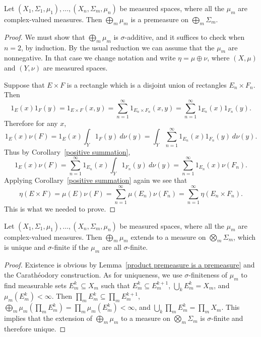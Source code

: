 \begin{lemma}
\label{product premeasure is a premeasure}
Let $(X_1, \Sigma_1, \mu_1), \dots, (X_{n}, \Sigma_{m}, \mu_{n})$ be measured spaces, where all the $\mu_{m}$ are complex-valued measures.
Then $\bigoplus_{m} \mu_{m}$ is a premeasure on $\bigoplus_{m} \Sigma_{m}$.
\end{lemma}
\begin{proof}
We must show that $\bigoplus_{m} \mu_{m}$ is $\sigma$-additive, and it suffices to check when $n = 2$, by induction.
By the usual reduction we can assume that the $\mu_{m}$ are nonnegative.
In that case we change notation and write $\eta = \mu \oplus \nu$, where $(X, \mu)$ and $(Y, \nu)$ are measured spaces.

Suppose that $E \times F$ is a rectangle which is a disjoint union of rectangles $E_{n} \times F_{n}$.
Then
\[1_E(x) 1_F(y) = 1_{E \times F}(x, y) = \sum_{n=1}^{\infty} 1_{E_{n} \times F_{n}}(x, y) = \sum_{n=1}^{\infty} 1_{E_{n}}(x) 1_{F_{n}}(y).\]
Therefore for any $x$,
\[1_E(x) \nu(F) = 1_E(x) \int_{Y} 1_F(y)~d\nu(y) = \int_{Y} \sum_{n=1}^{\infty} 1_{E_{n}}(x) 1_{F_{n}}(y) ~d\nu(y).\]
Thus by Corollary~\ref{positive summation},
\[1_E(x) \nu(F) = \sum_{n=1}^{\infty} 1_{E_{n}}(x) \int_{Y} 1_{F_{n}}(y)~d\nu(y) = \sum_{n=1}^{\infty} 1_{E_{n}}(x)\nu(F_{n}).\]
Applying Corollary~\ref{positive summation} again we see that
\[\eta(E \times F) = \mu(E) \nu(F) = \sum_{n=1}^{\infty} \mu(E_{n}) \nu(F_{n}) = \sum_{n=1}^{\infty} \eta(E_{n} \times F_{n}).\]
This is what we needed to prove.
\end{proof}

\begin{corollary}
Let $(X_1, \Sigma_1, \mu_1), \dots, (X_{n}, \Sigma_{m}, \mu_{n})$ be measured spaces, where all the $\mu_{m}$ are complex-valued measures.
Then $\bigoplus_{m} \mu_{m}$ extends to a measure on $\bigotimes_{m} \Sigma_{m}$, which is unique and $\sigma$-finite if the $\mu_{m}$ are all $\sigma$-finite.
\end{corollary}
\begin{proof}
Existence is obvious by Lemma~\ref{product premeasure is a premeasure} and the Carathéodory construction.
As for uniqueness, we use $\sigma$-finiteness of $\mu_{m}$ to find measurable sets $E_{m}^{k} \subseteq X_{m}$ such that $E_{m}^{k} \subseteq E_{m}^{k+1}$, $\bigcup_{k} E_{m}^{k} = X_{m}$, and $\mu_{m}(E_{m}^k) < \infty$.
Then $\prod_{m} E_{m}^{k} \subseteq \prod_{m} E_{m}^{k+1}$, $\bigoplus_{m} \mu_{m}(\prod_{m} E_{m}^k) = \prod_{m} \mu_{m}(E_{m}^k) < \infty$, and $\bigcup_{k} \prod_{m} E_{m}^{k} = \prod_{m} X_{m}$.
This implies that the extension of $\bigoplus_{m} \mu_{m}$ to a measure on $\bigotimes_{m} \Sigma_{m}$ is $\sigma$-finite and therefore unique.
\end{proof}


